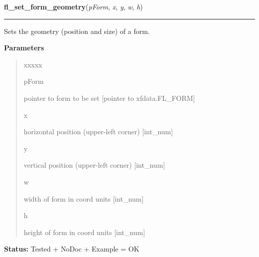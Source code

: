 \hspace{.8\funcindent}\begin{boxedminipage}{\funcwidth}

    \raggedright \textbf{fl\_set\_form\_geometry}(\textit{pForm}, \textit{x}, \textit{y}, \textit{w}, \textit{h})

    \vspace{-1.5ex}

    \rule{\textwidth}{0.5\fboxrule}
\setlength{\parskip}{2ex}
    Sets the geometry (position and size) of a form.

\setlength{\parskip}{1ex}
      \textbf{Parameters}
      \vspace{-1ex}

      \begin{quote}
        \begin{Ventry}{xxxxx}

          \item[pForm]

          pointer to form to be set [pointer to xfdata.FL\_FORM]

          \item[x]

          horizontal position (upper-left corner) [int\_num]

          \item[y]

          vertical position (upper-left corner) [int\_num]

          \item[w]

          width of form in coord units [int\_num]

          \item[h]

          height of form in coord units [int\_num]

        \end{Ventry}

      \end{quote}

\textbf{Status:} Tested + NoDoc + Example = OK



    \end{boxedminipage}

    \label{xformslib:library:fl_set_form_geometry}

    \vspace{0.5ex}

